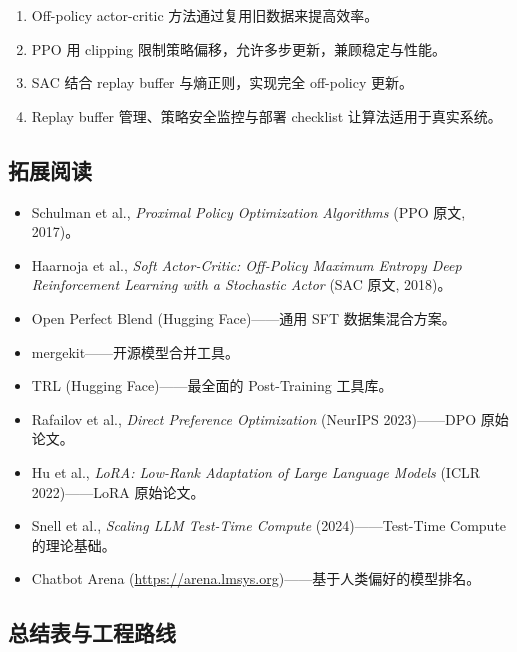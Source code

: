 \documentclass[a4paper]{article}
\begin{document}
\begin{enumerate}
    \item Off-policy actor-critic 方法通过复用旧数据来提高效率。
    \item PPO 用 clipping 限制策略偏移，允许多步更新，兼顾稳定与性能。
    \item SAC 结合 replay buffer 与熵正则，实现完全 off-policy 更新。
    \item Replay buffer 管理、策略安全监控与部署 checklist 让算法适用于真实系统。
\end{enumerate}

\subsection{拓展阅读}
\begin{itemize}
    \item Schulman et al., \textit{Proximal Policy Optimization Algorithms} (PPO 原文, 2017)。
    \item Haarnoja et al., \textit{Soft Actor-Critic: Off-Policy Maximum Entropy Deep Reinforcement Learning with a Stochastic Actor} (SAC 原文, 2018)。
    \item Open Perfect Blend (Hugging Face)——通用 SFT 数据集混合方案。
    \item mergekit——开源模型合并工具。
    \item TRL (Hugging Face)——最全面的 Post-Training 工具库。
    \item Rafailov et al., \textit{Direct Preference Optimization} (NeurIPS 2023)——DPO 原始论文。
    \item Hu et al., \textit{LoRA: Low-Rank Adaptation of Large Language Models} (ICLR 2022)——LoRA 原始论文。
    \item Snell et al., \textit{Scaling LLM Test-Time Compute} (2024)——Test-Time Compute 的理论基础。
    \item Chatbot Arena (\url{https://arena.lmsys.org})——基于人类偏好的模型排名。
\end{itemize}

\subsection{总结表与工程路线}
\end{document}
